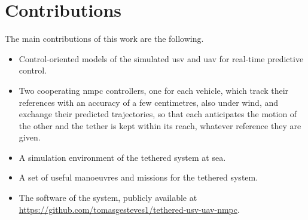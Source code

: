 
\section{Contributions}
\label{sec:intro_contributions}

The main contributions of this work are the following.
\begin{itemize}
    \item Control-oriented models of the simulated \gls{usv} and \gls{uav} for real-time predictive control.
    \item Two cooperating \gls{nmpc} controllers, one for each vehicle, which track their references with an accuracy of a few centimetres, also under wind, and exchange their predicted trajectories, so that each anticipates the motion of the other and the tether is kept within its reach, whatever reference they are given.
    \item A simulation environment of the tethered system at sea.
    \item A set of useful manoeuvres and missions for the tethered system.
    \item The software of the system, publicly available at \url{https://github.com/tomasgesteves1/tethered-usv-uav-nmpc}.
\end{itemize}
